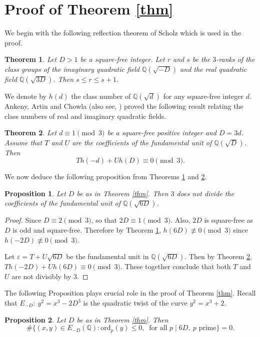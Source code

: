 \documentclass[12pt, 14paper,reqno]{amsart}
\theoremstyle{plain}
\newtheorem{prop}{Proposition}[section]
\newtheorem{thma}{Theorem}
\theoremstyle{proof}
\numberwithin{equation}{section}
\begin{document}
\section{Proof of Theorem \ref{thm}}
We begin with the following reflection theorem of Scholz \cite{SC} which is used in the proof. 
\begin{thma}\label{thmsc} Let $D>1$ be a square-free integer. Let $r$ and $s$ be the $3$-ranks of the class groups of the imaginary quadratic field $\mathbb{Q}(\sqrt{-D})$ and the real quadratic field $\mathbb{Q}(\sqrt{3D})$. Then $s\leq r\leq s+1$.
\end{thma}
We denote by $h(d)$ the class number of $\mathbb{Q}(\sqrt{d})$ for any square-free integer $d$. Ankeny, Artin and Chowla \cite[Theorem II]{AAC} (also see, \cite{HS}) proved the following result relating the class numbers of real and imaginary quadratic fields.
\begin{thma}\label{thmB} Let
$d\equiv 1\pmod 3$ be a square-free positive integer and $D= 3d$. Assume that $T$ and $U$ are the coefficients of the fundamental unit of $\mathbb{Q}(\sqrt{D})$. Then $$Th(-d)+Uh(D)\equiv 0\pmod 3.$$
\end{thma}
 We now deduce the following proposition from Theorems \ref{thmsc} and \ref{thmB}. 
 \begin{prop}\label{propcfu}
 Let $D$ be as in Theorem \ref{thm}. Then $3$ does not divide the coefficients of the fundamental unit of $\mathbb{Q}(\sqrt{6D})$. 
\end{prop}

\begin{proof}
Since $D\equiv 2\pmod 3$, so that $2D\equiv 1\pmod 3$. Also, $2D$ is square-free as $D$ is odd and square-free. Therefore by Theorem \ref{thmsc}, $h(6D)\not\equiv 0\pmod 3$ since $h(-2D)\not\equiv 0\pmod 3$.

Let $\varepsilon =T+U\sqrt{6D}$ be the fundamental unit in $\mathbb{Q}(\sqrt{6D})$. Then by Theorem \ref{thmB},
$Th(-2D)+Uh(6D)\equiv 0\pmod 3$.  These together conclude that both $T$ and $U$ are not divisibly by $3$.
\end{proof}
The following Proposition plays crucial role in the proof of Theorem \ref{thm}. Recall that $E_{-D}:~ y^2=x^3-2D^3$ is the quadratic twist of the curve $y^2=x^3+2$. 
\begin{prop}\label{prop1}
Let $D$ be as in Theorem \ref{thm}. Then $$\#\{(x,y)\in E_{-D}(\mathbb{Q}): \text{ord}_p(y)\leq 0,~\text{ for all }  p\mid 6D,~ p\text{ prime}\}=0.$$
\end{prop}
\end{document}
